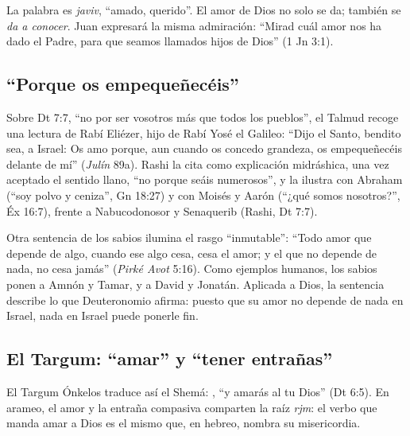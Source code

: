 
La palabra es  \emph{javiv}, ``amado, querido''. El amor de Dios no solo se da; también se \emph{da a conocer}. Juan expresará la misma admiración: ``Mirad cuál amor nos ha dado el Padre, para que seamos llamados hijos de Dios'' (1 Jn 3:1).

\subsection{“Porque os empequeñecéis”}
Sobre Dt 7:7, ``no por ser vosotros más que todos los pueblos'', el Talmud recoge una lectura de Rabí Eliézer, hijo de Rabí Yosé el Galileo: ``Dijo el Santo, bendito sea, a Israel: Os amo porque, aun cuando os concedo grandeza, os empequeñecéis delante de mí'' (\emph{Julín} 89a). Rashi la cita como explicación midráshica, una vez aceptado el sentido llano, ``no porque seáis numerosos'', y la ilustra con Abraham (``soy polvo y ceniza'', Gn 18:27) y con Moisés y Aarón (``¿qué somos nosotros?'', Éx 16:7), frente a Nabucodonosor y Senaquerib (Rashi, Dt 7:7).


Otra sentencia de los sabios ilumina el rasgo ``inmutable'': ``Todo amor que depende de algo, cuando ese algo cesa, cesa el amor; y el que no depende de nada, no cesa jamás'' (\emph{Pirké Avot} 5:16). Como ejemplos humanos, los sabios ponen a Amnón y Tamar, y a David y Jonatán. Aplicada a Dios, la sentencia describe lo que Deuteronomio afirma: puesto que su amor no depende de nada en Israel, nada en Israel puede ponerle fin.

\subsection{El Targum: “amar” y “tener entrañas”}
El Targum Ónkelos traduce así el Shemá: , ``y amarás al \SENOR{} tu Dios'' (Dt 6:5). En arameo, el amor y la entraña compasiva comparten la raíz \emph{rjm}: el verbo que manda amar a Dios es el mismo que, en hebreo, nombra su misericordia.

